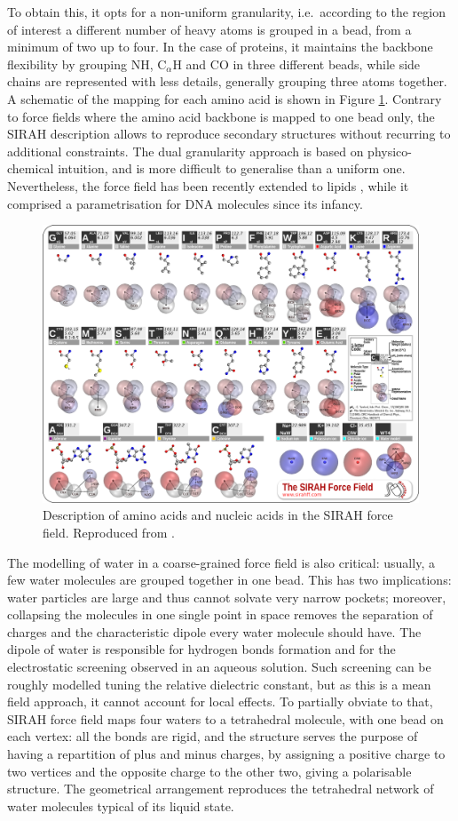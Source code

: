 To obtain this, it opts for a non-uniform granularity, i.e.\ according to the region of interest a different number of heavy atoms is grouped in a bead, from a minimum of two up to four. In the case of proteins, it maintains the backbone flexibility by grouping NH, C$_\alpha$H and CO in three different beads, while side chains are represented with less details, generally grouping three atoms together. A schematic of the mapping for each amino acid is shown in Figure \ref{fig:sirah}. Contrary to force fields where the amino acid backbone is mapped to one bead only, the SIRAH description allows to reproduce secondary structures without recurring to additional constraints.
%
The dual granularity approach is based on physico-chemical intuition, and is more difficult to generalise than a uniform one. Nevertheless, the force field has been recently extended to lipids \citep{Barrera2019}, while it comprised a parametrisation for DNA molecules since its infancy.
%
\begin{figure}[t!]
\centering
\includegraphics[width=0.8\linewidth]{2methods/pics/sirah_aa.png}
%
\caption[SIRAH force field amino acid and DNA description]{Description of amino acids and nucleic acids in the SIRAH force field. Reproduced from \citet{sirah_web}.}
\label{fig:sirah}
\end{figure}

The modelling of water in a coarse-grained force field is also critical: usually, a few water molecules are grouped together in one bead. This has two implications: water particles are large and thus cannot solvate very narrow pockets; moreover, collapsing the molecules in one single point in space removes the separation of charges and the characteristic dipole every water molecule should have. The dipole of water is responsible for hydrogen bonds formation and for the electrostatic screening observed in an aqueous solution. Such screening can be roughly modelled tuning the relative dielectric constant, but as this is a mean field approach, it cannot account for local effects.
%
To partially obviate to that, SIRAH force field maps four waters to a tetrahedral molecule, with one bead on each vertex: all the bonds are rigid, and the structure serves the purpose of having a repartition of plus and minus charges, by assigning a positive charge to two vertices and the opposite charge to the other two, giving a polarisable structure. The geometrical arrangement reproduces the tetrahedral network of water molecules typical of its liquid state.

